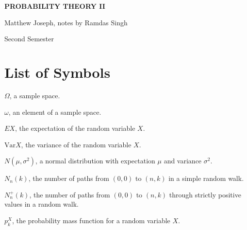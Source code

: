 \documentclass[15pt,a4paper]{book}
\theoremstyle{definition}
\begin{document}
\pagestyle{empty}

\begin{titlepage}
    \begin{center}
    \vspace*{\fill}
    {\Huge \textbf{\MakeUppercase{Probability Theory II}}\par}

    \vspace{0.5cm} %
    {\Large Matthew Joseph, notes by Ramdas Singh\par}

    \vspace{0.5cm} %
    {\large Second Semester\par}
    \vspace*{\fill}
    \end{center}
\end{titlepage}

\clearpage


\chapter*{List of Symbols}
\begin{notationlist}
    \item $\Omega$, a sample space.
    \item $\omega$, an element of a sample space.
    \item $EX$, the expectation of the random variable $X$.
    \item $\text{Var}X$, the variance of the random variable $X$.
    \item $N(\mu,\sigma^{2})$, a normal distribution with expectation $\mu$ and variance $\sigma^{2}$.
    \item $N_{n}(k)$, the number of paths from $(0,0)$ to $(n,k)$ in a simple random walk.
    \item $N_{n}^{+}(k)$, the number of paths from $(0,0)$ to $(n,k)$ through strictly positive values in a random walk.
    \item $p_{k}^{X}$, the probability mass function for a random variable $X$.
\end{notationlist}

\newpage
\setcounter{tocdepth}{2}
\tableofcontents

\newpage
{}
\pagestyle{fancy}
\end{document}
